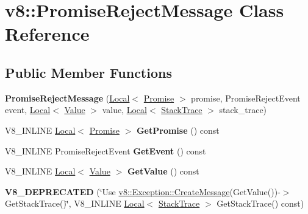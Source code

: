 \hypertarget{classv8_1_1_promise_reject_message}{}\section{v8\+:\+:Promise\+Reject\+Message Class Reference}
\label{classv8_1_1_promise_reject_message}
\subsection*{Public Member Functions}
\begin{DoxyCompactItemize}
\item 
{\bfseries Promise\+Reject\+Message} (\hyperlink{classv8_1_1_local}{Local}$<$ \hyperlink{classv8_1_1_promise}{Promise} $>$ promise, Promise\+Reject\+Event event, \hyperlink{classv8_1_1_local}{Local}$<$ \hyperlink{classv8_1_1_value}{Value} $>$ value, \hyperlink{classv8_1_1_local}{Local}$<$ \hyperlink{classv8_1_1_stack_trace}{Stack\+Trace} $>$ stack\+\_\+trace)\hypertarget{classv8_1_1_promise_reject_message_a052df173c75f1eb31b252714c88f3362}{}\label{classv8_1_1_promise_reject_message_a052df173c75f1eb31b252714c88f3362}

\item 
V8\+\_\+\+I\+N\+L\+I\+NE \hyperlink{classv8_1_1_local}{Local}$<$ \hyperlink{classv8_1_1_promise}{Promise} $>$ {\bfseries Get\+Promise} () const \hypertarget{classv8_1_1_promise_reject_message_a8582107385b66f911c6d4c9a17890222}{}\label{classv8_1_1_promise_reject_message_a8582107385b66f911c6d4c9a17890222}

\item 
V8\+\_\+\+I\+N\+L\+I\+NE Promise\+Reject\+Event {\bfseries Get\+Event} () const \hypertarget{classv8_1_1_promise_reject_message_a1380024500dac27eb74665701a80c6b0}{}\label{classv8_1_1_promise_reject_message_a1380024500dac27eb74665701a80c6b0}

\item 
V8\+\_\+\+I\+N\+L\+I\+NE \hyperlink{classv8_1_1_local}{Local}$<$ \hyperlink{classv8_1_1_value}{Value} $>$ {\bfseries Get\+Value} () const \hypertarget{classv8_1_1_promise_reject_message_ad87ec78d2e817b623d996f8db7d45ffc}{}\label{classv8_1_1_promise_reject_message_ad87ec78d2e817b623d996f8db7d45ffc}

\item 
{\bfseries V8\+\_\+\+D\+E\+P\+R\+E\+C\+A\+T\+ED} (\char`\"{}Use \hyperlink{classv8_1_1_exception_a8d575a721cf0fd5b325afb8b586c0d1e}{v8\+::\+Exception\+::\+Create\+Message}(Get\+Value())-\/$>$Get\+Stack\+Trace()\char`\"{}, V8\+\_\+\+I\+N\+L\+I\+NE \hyperlink{classv8_1_1_local}{Local}$<$ \hyperlink{classv8_1_1_stack_trace}{Stack\+Trace} $>$ Get\+Stack\+Trace() const)\hypertarget{classv8_1_1_promise_reject_message_af768aa21023875a4037d797d1e91fe42}{}\label{classv8_1_1_promise_reject_message_af768aa21023875a4037d797d1e91fe42}

\end{DoxyCompactItemize}
